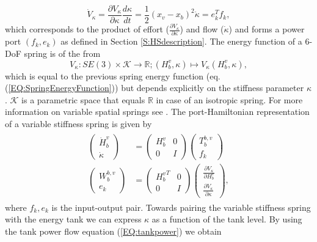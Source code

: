 \documentclass[a4paper,twoside, openright,12pt]{report}
\begin{document}
\begin{equation}
\dot{V}_{\kappa} =\frac{\partial V_{\kappa}}{\partial \kappa} \frac{d \kappa}{dt} = \frac{1}{2} (x_v-x_b)^2 \dot{\kappa} = e_k^Tf_k,
\end{equation}
which corresponds to the product of effort ($\frac{\partial V_{\kappa}}{\partial \kappa}$) and flow ($\dot{\kappa}$) and forms a power port $(f_k,e_k)$ as defined in Section \ref{S:HSdescription}. The energy function of a $6$-DoF spring is of the from
\begin{equation}
V_{\kappa}:SE(3) \times \mathcal{K} \rightarrow \mathbb{R}; (H_b^v,\kappa)\mapsto V_{\kappa}(H_b^v,\kappa),
\end{equation}
which is equal to the previous spring energy function (eq. (\ref{EQ:SpringEnergyFunction})) but depends explicitly on the stiffness parameter $\kappa$. $\mathcal{K}$ is a parametric space that equals $\mathbb{R}$ in case of an isotropic spring. For more information on variable spatial springs see \cite{Stramigioli_01c}. The port-Hamiltonian representation of a variable stiffness spring is given by
\begin{eqnarray}
\begin{aligned}
\begin{pmatrix}
\dot{H}_b^v \\ \dot{\kappa}
\end{pmatrix}
&=
\begin{pmatrix}
H_b^v & 0 \\ 0 & I
\end{pmatrix}
\begin{pmatrix}
T_b^{b,v} \\ f_k
\end{pmatrix}
\\
\begin{pmatrix}
W_b^{b,v} \\ e_k
\end{pmatrix}
&=
\begin{pmatrix}
{H_b^v}^T & 0 \\ 0 & I
\end{pmatrix}
\begin{pmatrix}
\frac{\partial V_{\kappa}}{\partial H_b^v} \\ \frac{\partial V_{\kappa}}{\partial \kappa}
\end{pmatrix},
\end{aligned}
\end{eqnarray}
where $f_k,e_k$ is the input-output pair. Towards pairing the variable stiffness spring with the energy tank we can express $\kappa$ as a function of the tank level. By using the tank power flow equation (\ref{EQ:tankpower}) we obtain
\end{document}
